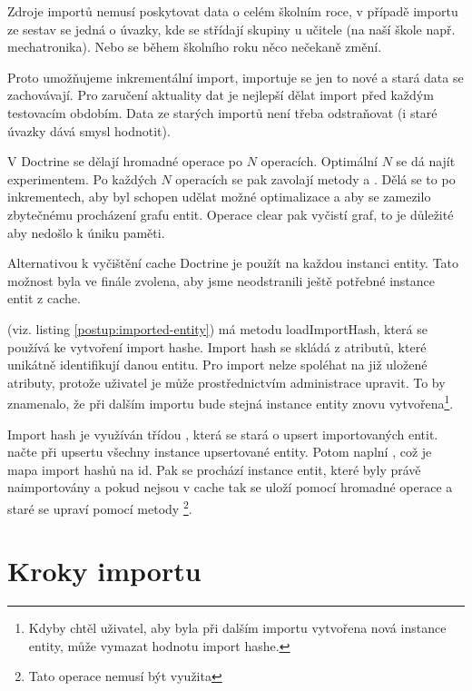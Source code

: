 Zdroje importů nemusí poskytovat data o celém školním roce, v případě importu ze sestav se jedná o úvazky, kde se střídají skupiny u učitele (na naší škole např. mechatronika).
 Nebo se během školního roku něco nečekaně změní.

Proto umožňujeme inkrementální import, importuje se jen to nové a stará data se zachovávají.
Pro zaručení aktuality dat je nejlepší dělat import před každým testovacím obdobím.
Data ze starých importů není třeba odstraňovat (i staré úvazky dává smysl hodnotit). 


V Doctrine se dělají hromadné operace po $N$ operacích. Optimální $N$ se dá najít experimentem.
Po každých $N$ operacích se pak zavolají metody  a .
Dělá se to po inkrementech, aby  byl schopen udělat možné optimalizace a aby se zamezilo zbytečnému procházení grafu entit. 
Operace clear pak vyčistí graf, to je důležité aby nedošlo k úniku paměti.

Alternativou k vyčištění cache Doctrine je použít  na každou instanci entity. Tato možnost byla ve finále zvolena, aby jsme neodstranili ještě potřebné instance entit z cache. 

 (viz. listing \ref{postup:imported-entity}) má metodu loadImportHash, která se používá ke vytvoření import hashe.
Import hash se skládá z atributů, které unikátně identifikují danou entitu.
Pro import nelze spoléhat na již uložené atributy, protože uživatel je může prostřednictvím administrace upravit.
To by znamenalo, že při dalším importu bude stejná instance entity znovu vytvořena\footnote{Kdyby chtěl uživatel, aby byla při dalším importu vytvořena nová instance entity, může vymazat hodnotu import hashe.}.


Import hash je využíván třídou , která se stará o upsert importovaných entit.
 načte při upsertu všechny instance upsertované entity.
Potom naplní , což je mapa import hashů na id.
Pak se prochází instance entit, které byly právě naimportovány a pokud nejsou v cache tak se uloží pomocí hromadné operace a staré  se upraví pomocí metody \footnote{Tato operace nemusí být využita}.


\section{Kroky importu}

